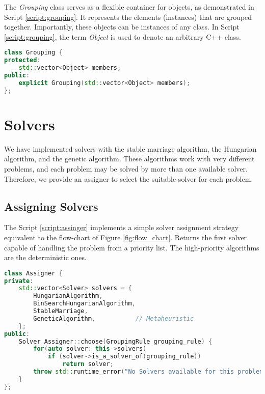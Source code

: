     The \textit{Grouping} class serves as a flexible container for objects, as demonstrated in Script \ref{script:grouping}. It represents the elements (instances) that are grouped together. Importantly, these objects can be instances of any class. In Script \ref{script:grouping}, the term \textit{Object} is used to denote an arbitrary C++ class.


    \begin{lstlisting}[language=C++, caption={\textit{Grouping} Class. It represents the elements (instances) that are grouped together.}, label={script:grouping}]
class Grouping {
protected:
    std::vector<Object> members;
public:
    explicit Grouping(std::vector<Object> members);
};
    \end{lstlisting}

    \section{Solvers}
        We have implemented solvers with the stable marriage algorithm, the Hungarian algorithm, and the genetic algorithm. 
        These algorithms work with very different problems, and each problem may be solved by more than one available solver.
        Therefore, we provide an assigner to select the suitable solver for each problem.
    
        \subsection{Assigning Solvers}
            The Script \ref{script:assinger} implements a simple solver assignment strategy equivalent to the flow-chart of Figure \ref{fig:flow_chart}.
            Returns the first solver capable of handling the problem from a priority list.
            The high-priority algorithms are the deterministic ones.
            
    \begin{lstlisting}[language=C++, caption={Assigner Class.}, label={script:assinger}]
class Assigner {
private:
    std::vector<Solver> solvers = {
        HungarianAlgorithm,
        BinSearchHungarianAlgorithm,
        StableMarriage,
        GeneticAlgorithm,           // Metaheuristic
    };
public:
    Solver Assigner::choose(GroupingRule grouping_rule) {
        for(auto solver: this->solvers)
            if (solver->is_a_solver_of(grouping_rule))
                return solver;
        throw std::runtime_error("No Solvers available for this problem");
    }
};
    \end{lstlisting}

